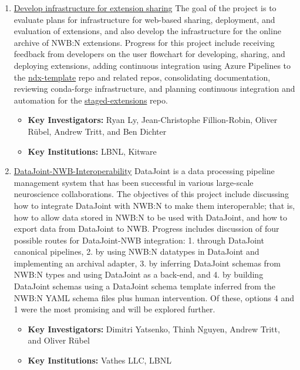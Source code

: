 \documentclass{article}
\begin{document}
\begin{enumerate}
    \item \href{https://neurodatawithoutborders.github.io/nwb_hackathons/HCK06_2019_Janelia/projects/ExtensionSharing/}{Develop infrastructure for extension sharing}  The goal of the project is to evaluate plans for infrastructure for web-based sharing, deployment, and evaluation of extensions, and also develop the infrastructure for the online archive of NWB:N extensions. Progress for this project include receiving feedback from developers on the user flowchart for developing, sharing, and deploying extensions, adding continuous integration using Azure Pipelines to the \href{https://github.com/nwb-extensions/ndx-template}{ndx-template} repo and related repos, consolidating documentation, reviewing conda-forge infrastructure, and planning continuous integration and automation for the \href{https://github.com/nwb-extensions/staged-extensions}{staged-extensions} repo.
        \vspace{-0.2cm}
        \begin{itemize}[noitemsep]
            \item \textbf{Key Investigators:} Ryan Ly, Jean-Christophe Fillion-Robin, Oliver R\"ubel, Andrew Tritt, and Ben Dichter
            \item \textbf{Key Institutions:} LBNL, Kitware
        \end{itemize}
        
    \item \href{https://neurodatawithoutborders.github.io/nwb_hackathons/HCK06_2019_Janelia/projects/DataJoint_NWB_Interoperability/}{DataJoint-NWB-Interoperability}  DataJoint is a data processing pipeline management system that has been successful in various large-scale neuroscience collaborations. The objectives of this project include discussing how to integrate DataJoint with NWB:N to make them interoperable; that is, how to allow data stored in NWB:N to be used with DataJoint, and how to  export data from DataJoint to NWB. Progress includes discussion of four possible routes for DataJoint-NWB integration: 1. through DataJoint canonical pipelines, 2. by using NWB:N datatypes in DataJoint and implementing an archival adapter, 3. by inferring DataJoint schemas from NWB:N types and using DataJoint as a back-end, and 4. by building DataJoint schemas using a DataJoint schema template inferred from the NWB:N YAML schema files plus human intervention. Of these, options 4 and 1 were the most promising and will be explored further. 
        \vspace{-0.2cm}
        \begin{itemize}[noitemsep]
            \item \textbf{Key Investigators:} Dimitri Yatsenko, Thinh Nguyen, Andrew Tritt, and Oliver R\"ubel
            \item \textbf{Key Institutions:} Vathes LLC, LBNL
        \end{itemize}
    

\end{enumerate}
\end{document}
